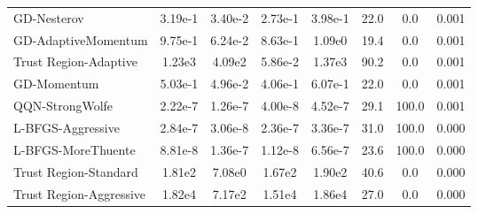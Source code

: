 \documentclass{article}
\begin{document}
\begin{table}[htbp]
{\begin{tabular}{p{2.5cm}*{7}{c}}
GD-Nesterov & 3.19e-1 & 3.40e-2 & 2.73e-1 & 3.98e-1 & 22.0 & 0.0 & 0.001 \\
GD-AdaptiveMomentum & 9.75e-1 & 6.24e-2 & 8.63e-1 & 1.09e0 & 19.4 & 0.0 & 0.001 \\
Trust Region-Adaptive & 1.23e3 & 4.09e2 & 5.86e-2 & 1.37e3 & 90.2 & 0.0 & 0.001 \\
GD-Momentum & 5.03e-1 & 4.96e-2 & 4.06e-1 & 6.07e-1 & 22.0 & 0.0 & 0.001 \\
QQN-StrongWolfe & 2.22e-7 & 1.26e-7 & 4.00e-8 & 4.52e-7 & 29.1 & 100.0 & 0.001 \\
L-BFGS-Aggressive & 2.84e-7 & 3.06e-8 & 2.36e-7 & 3.36e-7 & 31.0 & 100.0 & 0.000 \\
L-BFGS-MoreThuente & 8.81e-8 & 1.36e-7 & 1.12e-8 & 6.56e-7 & 23.6 & 100.0 & 0.000 \\
Trust Region-Standard & 1.81e2 & 7.08e0 & 1.67e2 & 1.90e2 & 40.6 & 0.0 & 0.000 \\
Trust Region-Aggressive & 1.82e4 & 7.17e2 & 1.51e4 & 1.86e4 & 27.0 & 0.0 & 0.000 \\
\bottomrule
\end{tabular}
}
\end{table}
\end{document}
